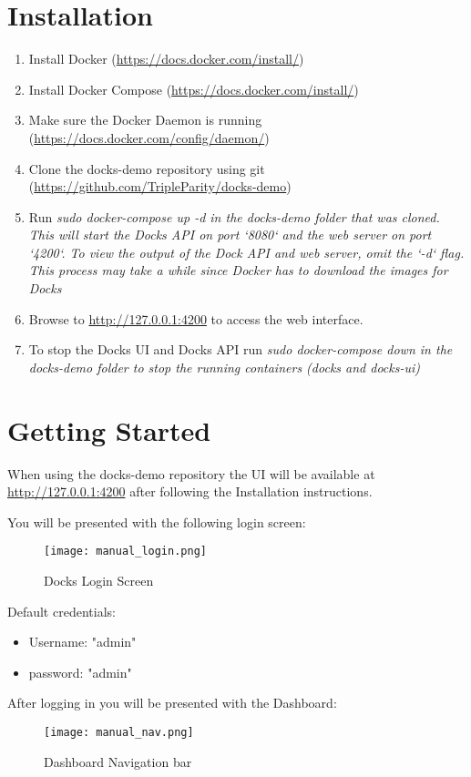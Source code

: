 \documentclass[]{article}
\begin{document}
\section{Installation}
\begin{enumerate}
	\item Install Docker (\url{https://docs.docker.com/install/})
	\item Install Docker Compose (\url{https://docs.docker.com/install/})
	\item Make sure the Docker Daemon is running (\url{https://docs.docker.com/config/daemon/})
	\item Clone the docks-demo repository using git (\url{https://github.com/TripleParity/docks-demo})
	\item Run \em{sudo docker-compose up -d} in the \em{docks-demo} folder that was cloned. This will start the Docks API on port `8080` and the web server on port `4200`. To view the output of the Dock API and web server, omit the `-d` flag. This process may take a while since Docker has to download the images for Docks
	\item Browse to \url{http://127.0.0.1:4200} to access the web interface.
	\item To stop the Docks UI and Docks API run \em{sudo docker-compose down} in the \em{docks-demo} folder to stop the running containers (docks and docks-ui)
\end{enumerate}


\section{Getting Started}
When using the docks-demo repository the UI will be available at \url{http://127.0.0.1:4200} after following the Installation instructions.

You will be presented with the following login screen:

\begin{figure}[h!]
	\centering
	\texttt{[image: manual\_login.png]}
	\caption{Docks Login Screen}
\end{figure}

Default credentials:
\begin{itemize}
	\item Username: "admin"
	\item password: "admin"
\end{itemize}

After logging in you will be presented with the Dashboard:
\begin{figure}[H]
	\centering
	\texttt{[image: manual\_nav.png]}
	\caption{Dashboard Navigation bar}
\end{figure}
\end{document}
